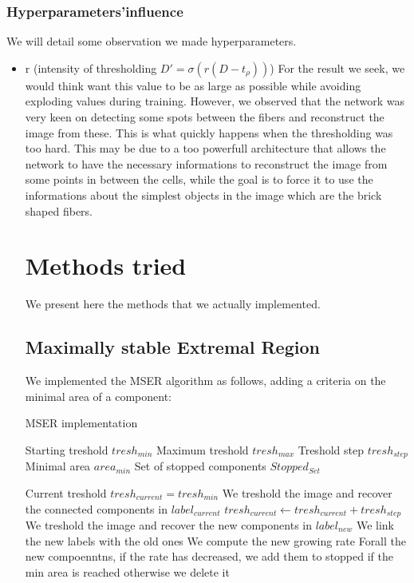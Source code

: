 \documentclass{report}
\begin{document}
\subsection{Hyperparameters'influence}
We will detail some observation we made hyperparameters.
\newline
\bigskip
\begin{itemize}
\item{r (intensity of thresholding $D'=\sigma(r(D-t_{\rho}))$)}
\medskip
\newline
For the result we seek, we would think want this value to be as large as possible while avoiding exploding values during training.
However, we observed that the network was very keen on detecting some spots between the fibers and reconstruct the image from these.
This is what quickly happens when the thresholding was too hard.\newline
This may be due to a too powerfull architecture that allows the network to have the necessary informations to reconstruct the image from some points in between the cells, while the goal is to force it to use the informations about the simplest objects in the image
which are the brick shaped fibers.
\


\chapter{Methods tried}
We present here the methods that we actually implemented.

\section{Maximally stable Extremal Region}

We implemented the MSER algorithm as follows, adding a criteria on the minimal area of a component:
\begin{algorithm}
\caption{MSER implementation}
\begin{algorithmic} 
\STATE Starting treshold $tresh_{min}$
\STATE Maximum treshold $tresh_{max}$
\STATE Treshold step $tresh_{step}$
\STATE Minimal area $area_{min}$ 
\STATE Set of stopped components $Stopped_{Set}$ \newline

\STATE Current treshold $tresh_{current} = tresh_{min}$
\STATE We treshold the image and recover the connected components in $label_{current}$
	\STATE $tresh_{current} \leftarrow tresh_{current} + tresh_{step}$
	\STATE We treshold the image and recover the new components in $label_{new}$
	\STATE We link the new labels with the old ones
	\STATE We compute the new growing rate
	\STATE Forall the new compoenntns, if the rate has decreased, we add them to stopped if the min area is reached otherwise we delete it
\ENDWHILE


\end{algorithmic}
\end{algorithm}
\end{itemize}
\end{document}

